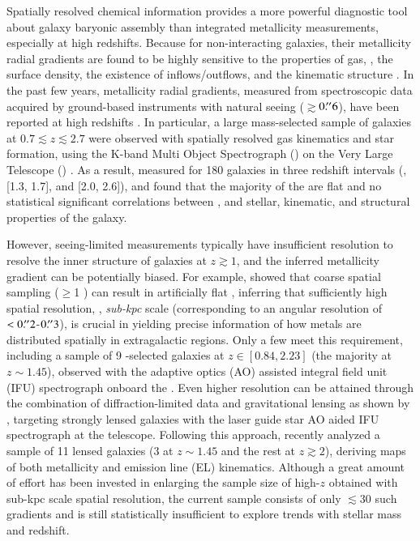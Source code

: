 Spatially resolved chemical information provides a more powerful diagnostic tool about galaxy baryonic assembly than
integrated metallicity measurements, especially at high redshifts. Because for non-interacting galaxies, their metallicity radial 
gradients are found to be highly sensitive to the properties of gas, \ie, the surface density, the existence of inflows/outflows, and the kinematic
structure \citep{Cresci:2010hr,2013ApJ...765...48J,2014A&A...563A..49S,Metallicityevolutio:2014kg}.
In the past few years, metallicity radial gradients, measured from spectroscopic data
acquired by ground-based instruments with natural seeing ($\gtrsim$$0\mbox{$.\!^{\prime\prime}$}6$), have been
reported at high redshifts
\citep{Queyrel:2012hw,Metallicityevolutio:2014kg,2014MNRAS.443.2695S}. In particular, a large
mass-selected sample of galaxies at $0.7\lesssim z\lesssim2.7$ were observed with spatially
resolved gas kinematics and star formation, using the K-band Multi Object Spectrograph
(\kmos) on the Very Large Telescope (\vlt) \citep[\ie, the \kd
survey,][]{2015ApJ...799..209W}.  As a result, \citet{Wuyts:2016th} measured \mgs for 180 \sf
galaxies in three redshift intervals (\ie [0.8, 1.0], [1.3, 1.7], and [2.0, 2.6]), and found
that the majority of the \mgs are flat and no statistical significant correlations between
\mgs, and stellar, kinematic, and structural properties of the galaxy.

However, seeing-limited measurements typically have insufficient resolution to resolve the inner structure of galaxies at
$z\gtrsim1$, and the inferred metallicity gradient can be potentially biased. For example, \citet{2013ApJ...767..106Y} showed that
coarse spatial sampling ($\geq$1 \kpc) can result in artificially flat \mgs, inferring that sufficiently high spatial resolution,
\ie, \emph{sub-kpc} scale (corresponding to an angular resolution of $<0\mbox{$.\!^{\prime\prime}$}2$-$0\mbox{$.\!^{\prime\prime}$}3$), is crucial in yielding precise
information of how metals are distributed spatially in extragalactic \HII regions.  Only a few \mgms meet this requirement,
including a sample of 9 \Ha-selected galaxies at $z\in[0.84,2.23]$ (the majority at $z\sim1.45$), observed with the adaptive
optics (AO) assisted integral field unit (IFU) spectrograph \sinf onboard the \vlt \citep{2012MNRAS.426..935S}. Even higher
resolution can be attained through the combination of diffraction-limited data and gravitational lensing as shown by
\citet{2010ApJ...725L.176J,2013ApJ...765...48J,Yuan:2011hj}, targeting strongly lensed galaxies with the laser guide star AO aided
IFU spectrograph \osiris at the \keck telescope. Following this approach, \citet{2015arXiv150901279L} recently analyzed a sample
of 11 lensed galaxies (3 at $z\sim1.45$ and the rest at $z\gtrsim2$), deriving maps of both metallicity and emission line (EL)
kinematics.  Although a great amount of effort has been invested in enlarging the sample size of high-$z$ \mgs obtained with
sub-kpc scale spatial resolution, the current sample consists of only $\lesssim30$ such gradients and is still statistically
insufficient to explore trends with stellar mass and redshift.

